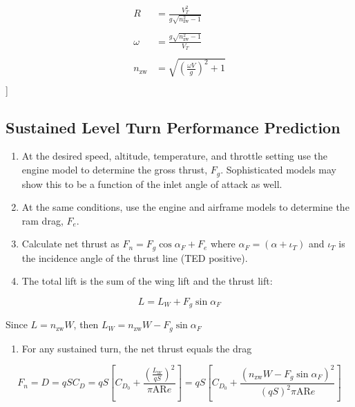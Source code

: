 \documentclass[
]{book}
\providecommand{\tightlist}{%
  \setlength{\itemsep}{0pt}\setlength{\parskip}{0pt}}
\begin{document}
\begin{align}
R &= \frac{V_T^2}{g \sqrt{n_{\text{zw}}^2 - 1}} \\
\\
\omega &= \frac{g \sqrt{n_{\text{zw}}^2 - 1}}{V_T} \\
\\
n_{\text{zw}} &= \sqrt{ \left( \frac{\omega V}{g} \right)^2 + 1  } \\
\end{align}
\label{eq:r-omega-n-zw}
{]}

\hypertarget{sustained-level-turn-performance-prediction}{%
\subsection{Sustained Level Turn Performance Prediction}\label{sustained-level-turn-performance-prediction}}

\begin{enumerate}
\def\labelenumi{\arabic{enumi}.}
\item
  At the desired speed, altitude, temperature, and throttle setting use the
  engine model to determine the gross thrust, \(F_g\). Sophisticated models may
  show this to be a function of the inlet angle of attack as well.
\item
  At the same conditions, use the engine and airframe models to determine the
  ram drag, \(F_e\).
\item
  Calculate net thrust as \(F_n = F_g \cos \alpha_F + F_e\) where
  \(\alpha_F = \left(\alpha + \iota_T \right)\) and \(\iota_T\) is the incidence angle of
  the thrust line (TED positive).
\item
  The total lift is the sum of the wing lift and the thrust lift:
\end{enumerate}

\[
L = L_W + F_g \sin \alpha_F
\]

Since \(L = n_{\text{zw}} W\), then \(L_W = n_{\text{zw}} W - F_g \sin \alpha_F\)

\begin{enumerate}
\def\labelenumi{\arabic{enumi}.}
\setcounter{enumi}{4}
\tightlist
\item
  For any sustained turn, the net thrust equals the drag
\end{enumerate}

\[
F_n = D = qSC_D = 
qS \left[ 
      C_{D_0} + 
      \frac{\left( \frac{L_W}{qS} \right)^2}{\pi \mathrm{AR}e} 
   \right] =
qS \left[
      C_{D_0} + 
      \frac{\left( n_{\text{zw}} W - F_g \sin \alpha_F \right)^2}
           {\left(qS\right)^2 \pi \mathrm{AR}e} 
   \right]
\]
\end{document}
